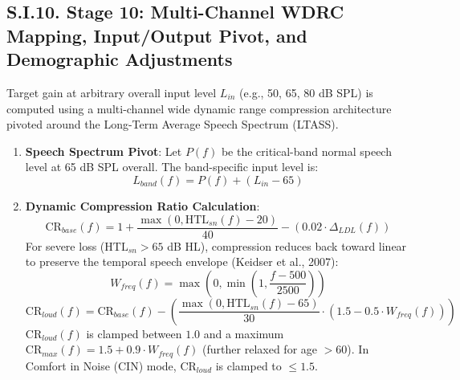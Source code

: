 \documentclass[
  12pt,
]{article}
\begin{document}
\subsection{S.I.10. Stage 10: Multi-Channel WDRC Mapping, Input/Output
Pivot, and Demographic
Adjustments}\label{s.i.10.-stage-10-multi-channel-wdrc-mapping-inputoutput-pivot-and-demographic-adjustments}

Target gain at arbitrary overall input level \(L_{in}\) (e.g., 50, 65,
80 dB SPL) is computed using a multi-channel wide dynamic range
compression architecture pivoted around the Long-Term Average Speech
Spectrum (LTASS).

\begin{enumerate}
\def\labelenumi{\arabic{enumi}.}
\item
  \textbf{Speech Spectrum Pivot}: Let \(P(f)\) be the critical-band
  normal speech level at 65 dB SPL overall. The band-specific input
  level is: \begin{equation}
  L_{band}(f) = P(f) + (L_{in} - 65)
  \end{equation}
\item
  \textbf{Dynamic Compression Ratio Calculation}: \begin{equation}
  \text{CR}_{base}(f) = 1 + \frac{\max\left(0, \text{HTL}_{sn}(f) - 20\right)}{40} - \left(0.02 \cdot \Delta_{LDL}(f)\right)
  \end{equation} For severe loss (\(\text{HTL}_{sn} > 65\) dB HL),
  compression reduces back toward linear to preserve the temporal speech
  envelope (Keidser et al., 2007): \begin{equation}
  W_{freq}(f) = \max\left(0, \min\left(1, \frac{f - 500}{2500}\right)\right)
  \end{equation} \begin{equation}
  \text{CR}_{loud}(f) = \text{CR}_{base}(f) - \left(\frac{\max(0, \text{HTL}_{sn}(f) - 65)}{30} \cdot (1.5 - 0.5 \cdot W_{freq}(f))\right)
  \end{equation} \(\text{CR}_{loud}(f)\) is clamped between \(1.0\) and
  a maximum \(\text{CR}_{max}(f) = 1.5 + 0.9 \cdot W_{freq}(f)\)
  (further relaxed for age \(> 60\)). In Comfort in Noise (CIN) mode,
  \(\text{CR}_{loud}\) is clamped to \(\le 1.5\).


\end{enumerate}
\end{document}
